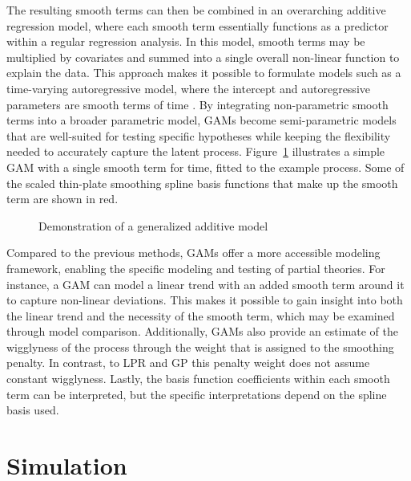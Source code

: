 \documentclass[man, floatsintext]{apa7}
\begin{document}
The resulting smooth terms can then be combined in an overarching additive
regression model, where each smooth term essentially functions as a
predictor within a regular regression
analysis. In this model, smooth terms may be multiplied by covariates and
summed into a single overall non-linear function to explain the data. This
approach makes it possible to formulate models such as a time-varying
autoregressive model, where the intercept and autoregressive parameters are
smooth terms of time \parencite{bringmann_changing_2017,
  bringmann_modeling_2015}. By integrating non-parametric smooth terms into a
broader parametric model, GAMs become semi-parametric models that are
well-suited for testing specific hypotheses while keeping the flexibility
needed to accurately capture the latent process. Figure~\ref{fig:gam_dem}
illustrates a simple GAM with a single smooth term for time, fitted to the
example process. Some of the scaled thin-plate smoothing spline basis
functions that make up the smooth term are shown in red.

\begin{figure}[!ht]
  \caption{Demonstration of a generalized additive model}
  \label{fig:gam_dem}
\end{figure}

Compared to the previous methods, GAMs offer a more accessible modeling
framework,
enabling the specific modeling and testing of partial theories. For instance, a
GAM can model a linear trend with an added smooth term around it to capture
non-linear deviations. This makes it possible to gain insight into both
the linear trend and the necessity of the smooth term, which may be examined
through model comparison.
Additionally, GAMs also provide an estimate of the wigglyness
of the process through the weight that is assigned to the smoothing penalty.
In contrast, to LPR and GP
this penalty weight does not assume constant wigglyness. Lastly, the
basis function coefficients within each smooth term can be interpreted,
but the specific interpretations depend on the spline basis used.

\section{Simulation}
\end{document}
